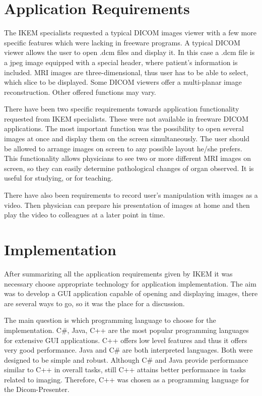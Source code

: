 \section{Application Requirements}
\label{requirements}
The IKEM specialists requested a typical DICOM images viewer with a few more specific features which were lacking in freeware programs. A typical DICOM viewer allows the user to open .dcm files and display it. In this case a .dcm file is a jpeg image equipped with a special header, where patient's information is included. MRI images are three-dimensional, thus user has to be able to select, which slice to be displayed. Some DICOM viewers offer a multi-planar image reconstruction. Other offered functions may vary.

There have been two specific requirements towards application functionality requested from IKEM specialists. These were not available in freeware DICOM applications. The most important function was the possibility to open several images at once and display them on the screen simultaneously. The user should be allowed to arrange images on screen to any possible layout he/she prefers. This functionality allows physicians to see two or more different MRI images on screen, so they can easily determine pathological changes of organ observed. It is useful for studying, or for teaching.

There have also been requirements to record user's manipulation with images as a video. Then physician can prepare his presentation of images at home and then play the video to colleagues at a later point in time.

\section{Implementation}
After summarizing all the application requirements given by IKEM it was necessary choose appropriate technology for application implementation. The aim was to develop a GUI application capable of opening and displaying images, there are several ways to go, so it was the place for a discussion. 

The main question is which programming language to choose for the implementation. C\#, Java, C++ are the most popular programming languages for extensive GUI applications. C++ offers low level features and thus it offers very good performance. Java and C\# are both interpreted languages. Both were designed to be simple and robust. Although C\# and Java provide performance similar to C++ in overall tasks, still C++ attains better performance in tasks related to imaging\cite{yyyy}. Therefore, C++ was chosen as a programming language for the Dicom-Presenter.

